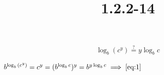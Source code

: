 \documentclass{article}
\title{1.2.2-14}
\begin{document}
\maketitle

\[\log_b(c^y) \overset{?}{=} y \log_b c \tag{1}\label{eq:1}\]

\( b^{\log_b{(c^y)}} = c^y = (b^{\log_b{c}})^y = b^{y \log_b{c}} \implies \eqref{eq:1} \)
\end{document}
